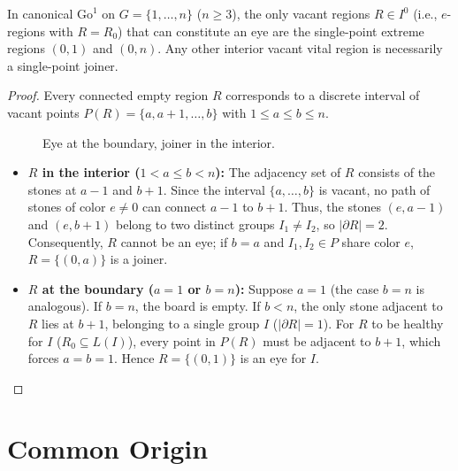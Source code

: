 \label{teoremas_go1}
\begin{lemma}
	In canonical $\mathrm{Go}^1$ on $G = \{1, \dots, n\}$ ($n \ge 3$), the only
	vacant regions $R \in I^0$ (i.e., $e$-regions with $R = R_0$) that can constitute
	an eye are the single-point extreme regions $(0,1)$ and $(0,n)$. Any
	other interior vacant vital region is necessarily a single-point joiner.
\end{lemma}
\begin{proof}
	Every connected empty region $R$ corresponds to a discrete interval of vacant points $P(R) = \{a, a+1, \dots, b\}$ with $1 \le a \le b \le n$.
	\begin{figure}[H]
		\centering
		\begin{goban}[7x1]
			\pgfgoticks
		\end{goban}
		\caption{\textcolor{amethyst}{Eye} at the boundary, \textcolor{bg}{joiner} in the interior.}
		\label{fig:ej_go1dim}
	\end{figure}
	\begin{itemize}
		\item \textbf{$R$ in the interior ($1 < a \le b < n$):} The adjacency set of $R$ consists of the
		stones at $a-1$ and $b+1$.
		Since the interval $\{a, \dots, b\}$ is vacant, no path of stones of
		color $e \neq 0$ can connect $a-1$ to $b+1$. Thus, the stones $(e, a-1)$ and $(e, b+1)$ belong
		to two distinct groups $I_1 \neq I_2$, so $|\partial R| = 2$.
		Consequently, $R$ cannot be an eye; if $b = a$ and $I_1, I_2 \in P$ share color $e$, $R = \{(0, a)\}$ is a joiner.
		
		\item \textbf{$R$ at the boundary ($a = 1$ or $b = n$):} Suppose $a = 1$ (the case $b = n$ is
		analogous). If $b = n$, the board is empty.
		If $b < n$, the only stone adjacent to $R$ lies at $b+1$, belonging to a single group $I$ ($|\partial R| = 1$).
		For $R$ to be healthy for $I$ ($R_0 \subseteq L(I)$), every point in $P(R)$ must be adjacent to $b+1$, which forces $a = b = 1$. Hence $R = \{(0, 1)\}$ is an eye for $I$.
	\end{itemize}
\end{proof}
\section{Common Origin}

